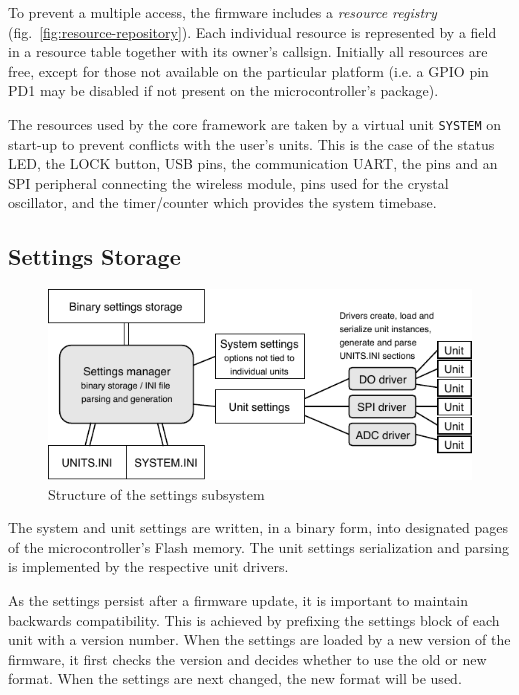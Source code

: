 To prevent a multiple access, the firmware includes a \textit{resource registry} (fig.~\ref{fig:resource-repository}). Each individual resource is represented by a field in a resource table together with its owner's callsign. Initially all resources are free, except for those not available on the particular platform (i.e. a GPIO pin PD1 may be disabled if not present on the microcontroller's package).

The resources used by the core framework are taken by a virtual unit \verb|SYSTEM| on start-up to prevent conflicts with the user's units. This is the case of the status \gls{LED}, the LOCK button, \gls{USB} pins, the communication \gls{UART}, the pins and an \gls{SPI} peripheral connecting the wireless module, pins used for the crystal oscillator, and the timer/counter which provides the system timebase.


\subsection{Settings Storage} \label{sec:settings-storage}

\begin{figure}[h]
	\centering
	\includegraphics[scale=1] {img/settings-storage.pdf}
	\caption{\label{fig:settings-storage}Structure of the settings subsystem}
\end{figure}

The system and unit settings are written, in a binary form, into designated pages of the microcontroller's Flash memory. The unit settings serialization and parsing is implemented by the respective unit drivers.

As the settings persist after a firmware update, it is important to maintain backwards compatibility. This is achieved by prefixing the settings block of each unit with a version number. When the settings are loaded by a new version of the firmware, it first checks the version and decides whether to use the old or new format. When the settings are next changed, the new format will be used.

